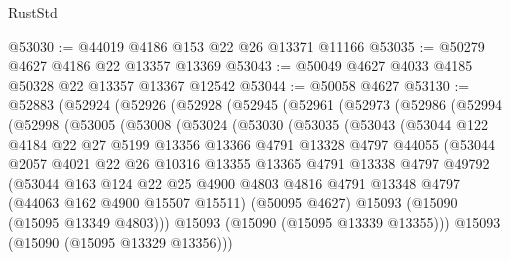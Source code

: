 \begin{lexlean}{RustStd}
\begin{coremodule}
@53030 := @44019 @4186 @153 @22 @26 @13371 @11166
@53035 := @50279 @4627 @4186 @22 @13357 @13369
@53043 := @50049 @4627 @4033 @4185 @50328 @22 @13357 @13367 @12542
@53044 := @50058 @4627
@53130 := @52883
    (@52924
      (@52926
        (@52928
          (@52945
            (@52961
              (@52973
                (@52986
                  (@52994
                    (@52998
                      (@53005
                        (@53008
                          (@53024
                            (@53030
                              (@53035
                                (@53043
                                  (@53044
                                    @122
                                    @4184
                                    @22
                                    @27
                                    @5199
                                    @13356
                                    @13366
                                    @4791
                                    @13328
                                    @4797
                                    @44055
                                    (@53044
                                      @2057
                                      @4021
                                      @22
                                      @26
                                      @10316
                                      @13355
                                      @13365
                                      @4791
                                      @13338
                                      @4797
                                      @49792
                                      (@53044
                                        @163
                                        @124
                                        @22
                                        @25
                                        @4900
                                        @4803
                                        @4816
                                        @4791
                                        @13348
                                        @4797
                                        (@44063 @162 @4900 @15507 @15511)
                                        (@50095 @4627)
                                        @15093
                                        (@15090 (@15095 @13349 @4803)))
                                      @15093
                                      (@15090 (@15095 @13339 @13355)))
                                    @15093
                                    (@15090 (@15095 @13329 @13356)))

\end{coremodule}
\end{lexlean}
